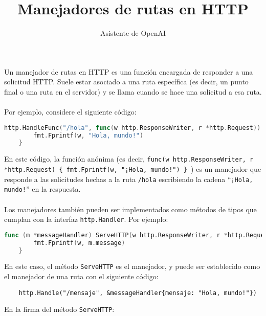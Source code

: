 \documentclass[]{article}
\title{Manejadores de rutas en HTTP}
\author{Asistente de OpenAI}
\date{}
\newcommand{\quotes}[1]{``#1''}
\begin{document}
\maketitle

Un manejador de rutas en HTTP es una función encargada de responder a una solicitud HTTP. Suele estar asociado a una ruta específica (es decir, un punto final o una ruta en el servidor) y se llama cuando se hace una solicitud a esa ruta.
\\\\
Por ejemplo, considere el siguiente código:

\begin{lstlisting}[language=Go]
	http.HandleFunc("/hola", func(w http.ResponseWriter, r *http.Request)) {
		fmt.Fprintf(w, "Hola, mundo!")
	}
\end{lstlisting}

En este código, la función anónima (es decir, \texttt{func(w http.ResponseWriter, r *http.Request) \{ fmt.Fprintf(w, "¡Hola, mundo!") \} }) es un manejador que responde a las solicitudes hechas a la ruta \texttt{/hola} escribiendo la cadena \quotes{\texttt{¡Hola, mundo!}} en la respuesta.
\\\\
Los manejadores también pueden ser implementados como métodos de tipos que cumplan con la interfaz \texttt{http.Handler}. Por ejemplo:

\begin{lstlisting}[language=Go]
	func (m *messageHandler) ServeHTTP(w http.ResponseWriter, r *http.Request) {
		fmt.Fprintf(w, m.message)
	}
\end{lstlisting}

En este caso, el método \texttt{ServeHTTP} es el manejador, y puede ser establecido como el manejador de una ruta con el siguiente código:

\begin{lstlisting}
	http.Handle("/mensaje", &messageHandler{mensaje: "Hola, mundo!"})
\end{lstlisting}

En la firma del método \texttt{ServeHTTP}:

\begin{abstract}

\end{abstract}

\section{}
\end{document}

